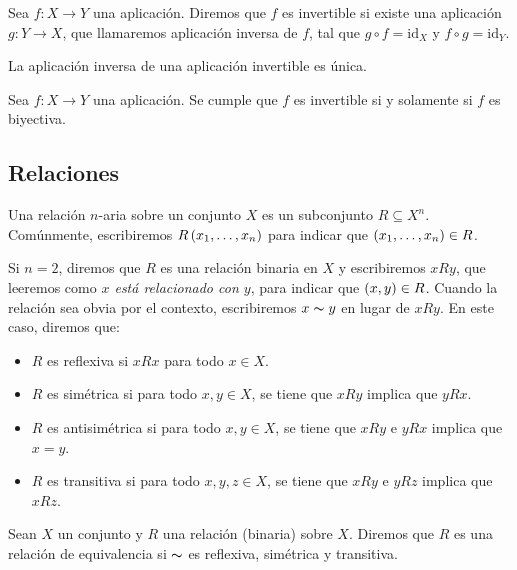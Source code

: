 \begin{definition}
  \rm Sea $f:X\rightarrow Y$ una aplicación. Diremos que $f$ es invertible si existe una aplicación $g:Y\rightarrow X$, que llamaremos aplicación inversa de $f$, tal que $g\circ f=\text{id}_X$ y $f\circ g=\text{id}_Y$.
\end{definition}

\begin{proposition}
  \rm La aplicación inversa de una aplicación invertible es única.
\end{proposition}

\begin{proposition}
  \rm Sea $f:X\rightarrow Y$ una aplicación. Se cumple que $f$ es invertible si y solamente si $f$ es biyectiva.
\end{proposition}

\subsection{Relaciones}
\begin{definition}

\rm Una relación $n$-aria sobre un conjunto $X$ es un subconjunto $R\subseteq X^n$. Comúnmente, escribiremos $R\left(x_1,\dots,x_n\right)$ para indicar que $\left(x_1,\dots,x_n\right)\in R$.

Si $n=2$, diremos que $R$ es una relación binaria en $X$ y escribiremos $xRy$, que leeremos como \textit{$x$ está relacionado con $y$}, para indicar que $\left(x,y\right)\in R$. Cuando la relación sea obvia por el contexto, escribiremos $x\thicksim y$ en lugar de $xRy$. En este caso, diremos que:

\begin{itemize}
  \item $R$ es reflexiva si $xRx$ para todo $x\in X$.
  \item $R$ es simétrica si para todo $x,y\in X$, se tiene que $xRy$ implica que $yRx$.
  \item $R$ es antisimétrica si para todo $x,y\in X$, se tiene que $xRy$ e $yRx$ implica que $x=y$.
  \item $R$ es transitiva si para todo $x,y,z\in X$, se tiene que $xRy$ e $yRz$ implica que $xRz$.
\end{itemize}
\end{definition}

\begin{definition}
  \rm Sean $X$ un conjunto y $R$ una relación (binaria) sobre $X$. Diremos que $R$ es una relación de equivalencia si $\thicksim$ es reflexiva, simétrica y transitiva.
\end{definition}

